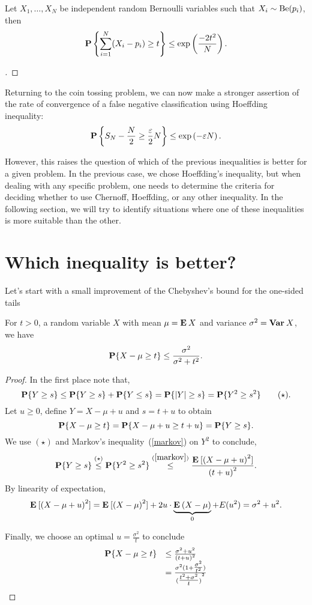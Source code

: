 \begin{corollary}
  Let $X_1,\ldots, X_N$ be independent random Bernoulli variables such that $X_i \sim \Be(p_i)$, then
  \[ \P\left\{ \sum_{i = 1}^N (X_i - p_i) \geq t\right\} \leq \exp\left( \frac{-2t^2}{N}\right). \] 
\end{corollary}

\begin{proof}[]

\end{proof}

Returning to the coin tossing problem, we can now make a stronger assertion of the rate of convergence of a false negative classification using Hoeffding inequality:
\[\P \left\{S_N- \frac{N}{2} \geq \frac{\varepsilon}{2} N \right\} \leq \exp\left( - \varepsilon N \right). \] 

However, this raises the question of which of the previous inequalities is better for a given problem. In the previous case, we chose Hoeffding's inequality, but when dealing with any specific problem, one needs to determine the criteria for deciding whether to use Chernoff, Hoeffding, or any other inequality. In the following section, we will try to identify situations where one of these inequalities is more suitable than the other.

\section{Which inequality is better?}
Let's start with a small improvement of the Chebyshev's bound for the one-sided tails

\begin{theorem}\label{cantelli}
  For $t > 0$, a random variable $X$ with mean $\mu = \E X$ and variance $\sigma^2 = \Var X$, we have
  \[ \P\{X-\mu \geq t\} \leq \frac{\sigma^2}{\sigma^2 + t^2}. \] 
\end{theorem}

\begin{proof}
  In the first place note that,
  \[ \P\{ Y \geq s\} \leq \P\{ Y \geq s\} + \P\{ Y \leq s\} = \P\{|Y| \geq s\} = \P\{ Y^2 \geq s^2\} \tag*{($\star$)}. \] 
  Let $u \geq 0$, define $Y = X-\mu + u$ and $s = t+u$ to obtain
  \[ \P\{X-\mu \geq t\} = \P\{X-\mu + u \geq t + u\} = \P\{Y \geq s\}. \]
  We use $(\star)$ and Markov's inequality~(\ref{markov}) on $Y^2$ to conclude,
  \[ \P\{Y \geq s\} \overset{(\star)}{\leq} \P\{ Y^2 \geq s^2\} \overset{(\ref{markov})}{\leq} \frac{\E[{(X-\mu+u)}^2]}{{(t+u)}^2}.\]
  By linearity of expectation,
  \[ \E[{(X-\mu+u)}^2] = \E[{(X-\mu)}^2] + 2u \cdot \underbrace{\E(X-\mu)}_{0} + E(u^2) = \sigma^2 + u^2. \]

  Finally, we choose an optimal $u = \frac{\sigma^2}{t}$ to conclude
  \[\begin{array}{rl}
    \P\{X-\mu \geq t\} & \leq \frac{\sigma^2 + u^2}{{(t+u)}^2}\\
    & = \frac{\sigma^2 (1+\tfrac{\sigma^2}{t^2})}{{(\tfrac{t^2+\sigma^2}{t})}^2} 
  \end{array}\]
  \[ \] 
\end{proof}

